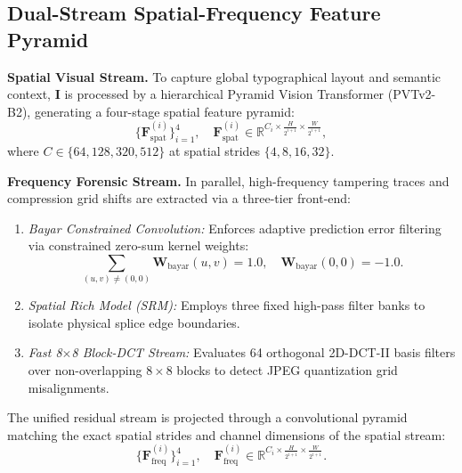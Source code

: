 \documentclass[10pt,twocolumn,letterpaper]{article}
\begin{document}
\subsection{Dual-Stream Spatial-Frequency Feature Pyramid}
\label{subsec:dual_stream}

\noindent\textbf{Spatial Visual Stream.} 
To capture global typographical layout and semantic context, $\mathbf{I}$ is processed by a hierarchical Pyramid Vision Transformer (PVTv2-B2), generating a four-stage spatial feature pyramid:
\begin{equation}
    \{\mathbf{F}_{\text{spat}}^{(i)}\}_{i=1}^4, \quad \mathbf{F}_{\text{spat}}^{(i)} \in \mathbb{R}^{C_i \times \frac{H}{2^{i+1}} \times \frac{W}{2^{i+1}}},
\end{equation}
where $C \in \{64, 128, 320, 512\}$ at spatial strides $\{4, 8, 16, 32\}$.

\noindent\textbf{Frequency Forensic Stream.} 
In parallel, high-frequency tampering traces and compression grid shifts are extracted via a three-tier front-end:
\begin{enumerate}
    \item \textit{Bayar Constrained Convolution:} Enforces adaptive prediction error filtering via constrained zero-sum kernel weights:
    \begin{equation}
        \sum_{(u,v) \neq (0,0)} \mathbf{W}_{\text{bayar}}(u, v) = 1.0, \quad \mathbf{W}_{\text{bayar}}(0, 0) = -1.0.
    \end{equation}
    \item \textit{Spatial Rich Model (SRM):} Employs three fixed high-pass filter banks to isolate physical splice edge boundaries.
    \item \textit{Fast 8$\times$8 Block-DCT Stream:} Evaluates 64 orthogonal 2D-DCT-II basis filters over non-overlapping $8 \times 8$ blocks to detect JPEG quantization grid misalignments.
\end{enumerate}
The unified residual stream is projected through a convolutional pyramid matching the exact spatial strides and channel dimensions of the spatial stream:
\begin{equation}
    \{\mathbf{F}_{\text{freq}}^{(i)}\}_{i=1}^4, \quad \mathbf{F}_{\text{freq}}^{(i)} \in \mathbb{R}^{C_i \times \frac{H}{2^{i+1}} \times \frac{W}{2^{i+1}}}.
\end{equation}
\end{document}
